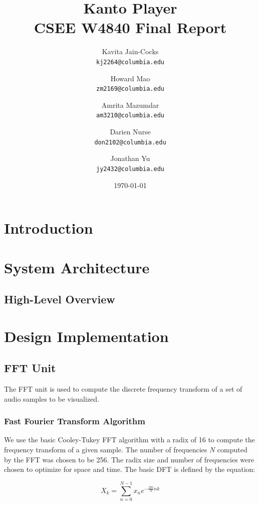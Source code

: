 \documentclass{article}
\title{Kanto Player \\
CSEE W4840 Final Report}
\author{
  Kavita Jain-Cocks\\
  \texttt{kj2264@columbia.edu}
  \and
  Howard Mao\\
  \texttt{zm2169@columbia.edu}
  \and
  Amrita Mazumdar\\
  \texttt{am3210@columbia.edu}
  \and
  Darien Nurse\\
  \texttt{don2102@columbia.edu}
  \and
  Jonathan Yu\\
  \texttt{jy2432@columbia.edu}
   \\}
\date{\today}
\begin{document}
\maketitle
\newpage


\section{Introduction}

\section{System Architecture}

\subsection{High-Level Overview}

\section{Design Implementation}
\subsection{FFT Unit}
The FFT unit is used to compute the discrete frequency transform of a set of audio
samples to be visualized. 

	\subsubsection{Fast Fourier Transform Algorithm}
	We use the basic Cooley-Tukey FFT algorithm with a radix of 16 to compute the
	frequency transform of a given sample. The number of frequencies \(N\) computed by 
	the FFT was chosen to be 256. The radix size and number of frequencies were chosen 
	to optimize for space and time. The basic DFT is defined by the equation:
	
	\begin{equation}
		X_k = \sum_{n=0}^{N-1} x_n e^{-\frac{2\pi i}{N} nk}
	\end{equation}
	
\end{document}
